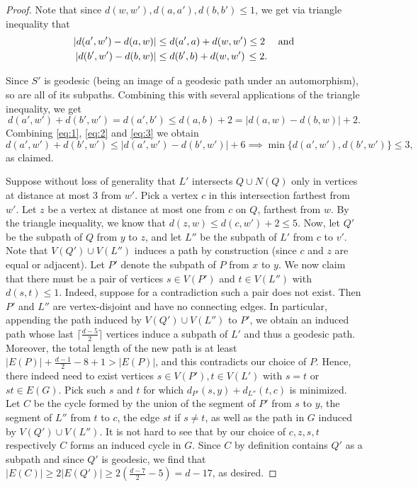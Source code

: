 \documentclass[english,11pt]{article}
\theoremstyle{definition}
\numberwithin{equation}{section}
\numberwithin{figure}{section}
\begin{document}
\begin{proof}
    Note that since $d(w,w'),d(a,a'),d(b,b') \le 1$, we get via triangle inequality that 
    \begin{align}\label{eq:1}
        |d(a',w')-d(a,w)|&\le d(a',a)+d(w,w') \le 2 \quad \text{ and}\\
        \label{eq:2}
        |d(b',w')-d(b,w)|&\le d(b',b)+d(w,w') \hspace{0.05cm}\le 2.
    \end{align}
    
    Since $S'$ is geodesic (being an image of a geodesic path under an automorphism), so are all of its subpaths. Combining this with several applications of the triangle inequality, we get
    \begin{equation}\label{eq:3}
        d(a', w')+d(b',w')=d(a',b') \le d(a,b)+2 = |d(a,w)-d(b,w)|+2.
    \end{equation} 
    Combining \eqref{eq:1}, \eqref{eq:2} and \eqref{eq:3} we obtain 
	$$d(a',w')+d(b',w') \le |d(a',w')-d(b',w')|+6 \implies \min\{d(a',w'),d(b',w')\}\le 3,$$
	 as claimed.
	
	Suppose without loss of generality
    that $L'$ intersects $Q \cup N(Q)$ only in vertices at distance at most $3$ from $w'$. Pick a vertex $c$ in this intersection farthest from $w'$. Let $z$ be a vertex at distance at most one from $c$ on $Q$, farthest from $w$. By the triangle inequality, we know that $d(z,w) \le d(c,w') +2 \le 5$. Now, let $Q'$ be the subpath of $Q$ from $y$ to $z$, and let $L''$ be the subpath of $L'$ from $c$ to $v'$. Note that $V(Q') \cup V(L'')$ induces a path by construction (since $c$ and $z$ are equal or adjacent). Let $P'$ denote the subpath of $P$ from $x$ to $y$.
    We now claim that there must be a pair of vertices $s\in V(P')$ and $t\in V(L'')$ with $d(s,t)\le 1$. Indeed, suppose for a contradiction such a pair does not exist. Then $P'$ and $L''$ are vertex-disjoint and have no connecting edges. In particular, appending the path induced by $V(Q')\cup V(L'')$ to $P'$, we obtain an induced path whose last $\lceil \frac{d-5}{2}\rceil$ vertices induce a subpath of $L'$ and thus a geodesic path. Moreover, the total length of the new path is at least $|E(P)|+\frac{d-1}{2}-8+1 > |E(P)|$, and this contradicts our choice of $P$. Hence, there indeed need to exist vertices $s\in V(P'), t \in V(L')$ with $s=t$ or $st\in E(G)$. Pick such $s$ and $t$ for which $d_{P'}(s,y)+d_{L''}(t,c)$ is minimized. Let $C$ be the cycle formed by the union of the segment of $P'$ from $s$ to $y$, the segment of $L''$ from $t$ to $c$, the edge $st$ if $s\neq t$, as well as the path in $G$ induced by $V(Q')\cup V(L'')$. It is not hard to see that by our choice of $c,z,s,t$ respectively $C$ forms an induced cycle in $G$. Since $C$ by definition contains $Q'$ as a subpath and since $Q'$ is geodesic, we find that $|E(C)|\ge 2|E(Q')|\geq 2(\frac{d-7}{2}-5)=d-17$, as desired. 
\end{proof}
\end{document}
